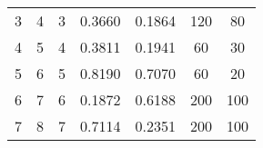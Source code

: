 \begin{table}[]
\begin{adjustbox}{width=1.1\textwidth,center=\textwidth}
\begin{tabular}{@{}ccccccc@{}}
3                                                              & 4                                                              & 3                                                    & 0.3660                                                                         & 0.1864                                                                         & 120                                                                              & 80                                                                                   \\
4                                                              & 5                                                              & 4                                                    & 0.3811                                                                         & 0.1941                                                                         & 60                                                                               & 30                                                                                   \\
5                                                              & 6                                                              & 5                                                    & 0.8190                                                                         & 0.7070                                                                         & 60                                                                               & 20                                                                                   \\
6                                                              & 7                                                              & 6                                                    & 0.1872                                                                         & 0.6188                                                                         & 200                                                                              & 100                                                                                  \\
7                                                              & 8                                                              & 7                                                    & 0.7114                                                                         & 0.2351                                                                         & 200                                                                              & 100                                                                                  \\

\end{tabular}
\end{adjustbox}
\end{table}
